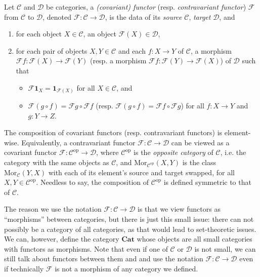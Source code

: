 \documentclass[11pt]{book}
\begin{document}
\begin{definition}Let $\mathcal C$ and $\mathcal D$ be categories, a \textit{(covariant) functor} (resp. \textit{contravariant functor}) $\mathscr{F}$ from $\mathcal C$ to $\mathcal D$, denoted $\mathscr{F}:\mathcal C\rightarrow\mathcal{D}$, is the data of its \textit{source} $\mathcal C$, \textit{target} $\mathcal D$, and 
\begin{enumerate}[label=(\roman*)]
	\item for each object $X\in\mathcal C$, an object $\mathscr{F}(X)\in\mathcal D$,
	\item for each pair of objects $X,Y\in\mathcal C$ and each $f:X\rightarrow Y$ of $\mathcal C$, a morphism $\mathscr{F}f:\mathscr{F}(X)\rightarrow\mathscr{F}(Y)$ (resp. a morphism $\mathscr{F}f:\mathscr{F}(Y)\rightarrow\mathscr{F}(X)$) of $\mathcal D$ such that 
	\begin{itemize}
		\item $\mathscr{F}\mathbf{1}_X=\mathbf 1_{\mathscr{F}(X)}$ for all $X\in\mathcal C$, and
		\item $\mathscr{F}(g\circ f)=\mathscr{F}g\circ\mathscr{F}f$ (resp. $\mathscr{F}(g\circ f)=\mathscr{F}f\circ \mathscr{F}g$) for all $f:X\rightarrow Y$ and $g:Y\rightarrow Z$.
	\end{itemize}
\end{enumerate}
The composition of covariant functors (resp. contravariant functors) is element-wise. Equivalently, a contravariant functor $\mathscr{F}:\mathcal C\rightarrow\mathcal D$ can be viewed as a covariant functor $\mathscr{F}:\mathcal C^{\mathrm{op}}\rightarrow\mathcal D$, where $\mathcal C^{\mathrm{op}}$ is the \textit{opposite category} of $\mathcal C$, i.e. the category with the same objects as $\mathcal C$, and $\mathrm{Mor}_{\mathcal{C}^{\mathrm{op}}}(X,Y)$ is the class $\mathrm{Mor}_{\mathcal C}(Y,X)$ with each of its element's source and target swapped, for all $X,Y\in\mathcal C^{\mathrm{op}}$. Needless to say, the composition of $\mathcal{C}^{\mathrm{op}}$ is defined symmetric to that of $\mathcal C$.
\end{definition}
The reason we use the notation $\mathscr{F}:\mathcal C\rightarrow\mathcal D$ is that we view functors as ``morphisms'' between categories, but there is just this small issue: there can not possibly be a category of all categories, as that would lead to set-theoretic issues. We can, however, define the category $\mathbf{Cat}$ whose objects are all small categories with functors as morphisms. Note that even if one of $\mathcal C$ or $\mathcal D$ is not small, we can still talk about functors between them and and use the notation $\mathscr{F}:\mathcal C\rightarrow\mathcal D$ even if technically $\mathscr{F}$ is not a morphism of any category we defined. 
\end{document}

